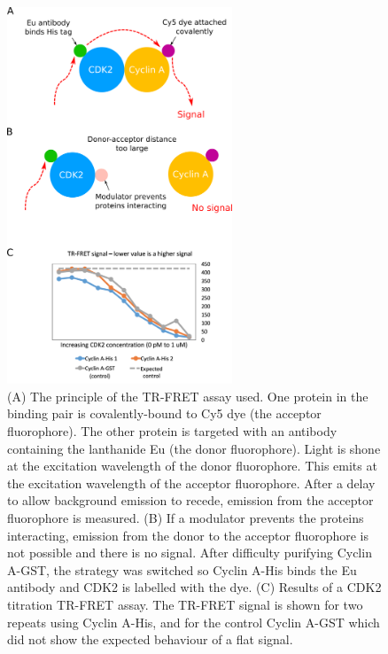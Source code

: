 \begin{figure}
\centering

\includegraphics[width=0.6\textwidth]{figures/tr_fret/tr_fret}

\caption{(A) The principle of the TR-FRET assay used.
One protein in the binding pair is covalently-bound to Cy5 dye (the acceptor fluorophore).
The other protein is targeted with an antibody containing the lanthanide Eu (the donor fluorophore).
Light is shone at the excitation wavelength of the donor fluorophore.
This emits at the excitation wavelength of the acceptor fluorophore.
After a delay to allow background emission to recede, emission from the acceptor fluorophore is measured.
(B) If a modulator prevents the proteins interacting, emission from the donor to the acceptor fluorophore is not possible and there is no signal.
After difficulty purifying Cyclin A-GST, the strategy was switched so Cyclin A-His binds the Eu antibody and CDK2 is labelled with the dye.
(C) Results of a CDK2 titration TR-FRET assay.
The TR-FRET signal is shown for two repeats using Cyclin A-His, and for the control Cyclin A-GST which did not show the expected behaviour of a flat signal.}

\label{fig:tr_fret}
\end{figure}



